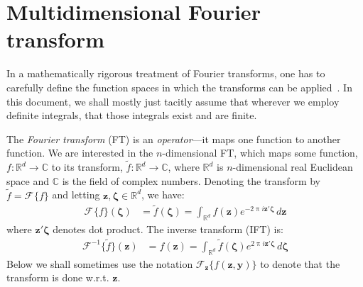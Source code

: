 \documentclass[a4paper,oneside,12pt,english]{report}
\def\zvec{\mathbf{z}}
\def\R{\mathbb{R}}
\def\Lset{\mathcal{L}}
\def\yvec{\mathbf{y}}
\def\Rset{\mathcal{R}}
\def\funcdef#1#2#3{#1:#2\to#3}
\def\Fset{\mathcal{F}}
\def\C{\mathbb{C}}
\newcommand\FT[2][]{\Fset_{#1}\{#2\}}
\def\IFT#1{\Fset^{-1}\{#1\}}
\begin{document}
   

%

\appendix



\chapter{Multidimensional Fourier transform}
\label{chap:MDFT}
\def\zetavec{\boldsymbol{\zeta}}
In a mathematically rigorous treatment of Fourier transforms, one has to carefully define the function spaces in which the transforms can be applied~\cite{SteinWeiss}. In this document, we shall mostly just tacitly assume that wherever we employ definite integrals, that those integrals exist and are finite.

The \emph{Fourier transform} (FT) is an \emph{operator}---it maps one function to another function. We are interested in the $n$-dimensional FT, which maps some function, $\funcdef{f}{\R^d}{\C}$ to its transform, $\funcdef{\tilde f}{\R^d}{\C}$, where $\R^d$ is $n$-dimensional real Euclidean space and $\C$ is the field of complex numbers. Denoting the transform by $\tilde f = \FT{f}$ and letting $\zvec,\zetavec\in\R^d$, we have:
\begin{align}
\label{eq:FT}
\FT{f}(\zetavec) &= \tilde f(\zetavec) = \int_{\R^d} f(\zvec)e^{-2\uppi i\zvec'\zetavec}\,d\zvec
\end{align}
where $\zvec'\zetavec$ denotes dot product. The inverse transform (IFT) is:
\begin{align}
\IFT{\tilde f}(\zvec) &= f(\zvec) = \int_{\R^d} \tilde f(\zetavec)e^{2\uppi i\zvec'\zetavec}\,d\zetavec
\end{align}
Below we shall sometimes use the notation $\FT[\zvec]{f(\zvec,\yvec)}$ to denote that the transform is done w.r.t. $\zvec$.
\end{document}
